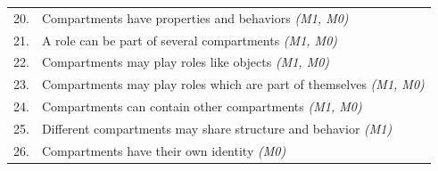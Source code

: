 \begin{table}[tb]
\begin{tabular}[]{@{}cp{}}
20.
 & 
Compartments have properties and behaviors \emph{(M1, M0)}
\tabularnewline

21.
 & 
A role can be part of several compartments \emph{(M1, M0)}
\tabularnewline

22.
 & 
Compartments may play roles like objects \emph{(M1, M0)}
\tabularnewline

23.
 & 
Compartments may play roles which are part of themselves \emph{(M1,
M0)}
\tabularnewline

24.
 & 
Compartments can contain other compartments \emph{(M1, M0)}
\tabularnewline

25.
 & 
Different compartments may share structure and behavior
\emph{(M1)}
\tabularnewline

26.
 & 
Compartments have their own identity \emph{(M0)}
\tabularnewline
\bottomrule
\end{tabular}
\end{table}
